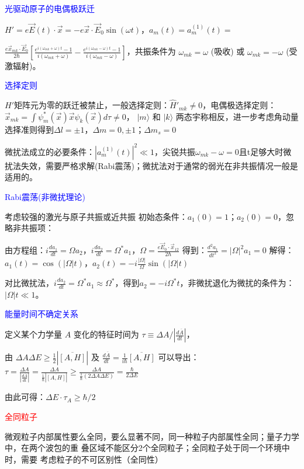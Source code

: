 \documentclass[a4paper,8pt]{extarticle} %
\newcommand{\bluetext}[1]{\textcolor{blue}{#1}}
\newcommand{\redtext}[1]{\textcolor{red}{#1}}
\begin{document}
\begin{multicols}{3}
\bluetext{光驱动原子的电偶极跃迁}

$H' = e\vec{E}(t)\cdot\vec{x} = -e\vec{x}\cdot\vec{E}_0\sin(\omega t)$，$a_m(t) = a_m^{(1)}(t) =$ 

$ \frac{e\vec{x}_{mk}\cdot\vec{E}_0}{2\hbar}\left[\frac{e^{i(\omega_{mk}+\omega)t}-1}{i(\omega_{mk}+\omega)} - \frac{e^{i(\omega_{mk}-\omega)t}-1}{i(\omega_{mk}-\omega)}\right]$，共振条件为 $\omega_{mk} = \omega$ (吸收) 或 $\omega_{mk} = -\omega$ (受激辐射)。

\bluetext{选择定则}

$H'$矩阵元为零的跃迁被禁止，一般选择定则：$\hat{H}'_{mk}\neq 0$，电偶极选择定则：$\vec{x}_{mk}=\int{\psi_m^*(\vec{x})\vec{x}\psi_k(\vec{x}) d\tau} \neq 0$，
$|m\rangle$ 和 $|k\rangle$ 两态宇称相反，进一步考虑角动量选择准则得到$\Delta l = \pm1$，$\Delta m = 0, \pm1$；$\Delta m_s = 0$

微扰法成立的必要条件：$|a_m^{(1)}(t)|^2\ll 1$，尖锐共振$\omega_{mk}-\omega=0$且t足够大时微扰法失效，需要严格求解(Rabi震荡)；微扰法对于通常的弱光在非共振情况一般是适用的。

\bluetext{Rabi震荡(非微扰理论)}

考虑较强的激光与原子共振或近共振
初始态条件：$a_1(0) = 1$；$a_2(0) = 0$，忽略非共振项：

由方程组：$i\frac{da_1}{dt} = \Omega a_2$，$i\frac{da_2}{dt} = \Omega^* a_1$，$\Omega = \frac{e\vec{E}_0\cdot\vec{x}_{12}}{2\hbar}$ 得到：$\frac{d^2a_1}{dt^2} = |\Omega|^2 a_1 = 0$ 解得：$a_1(t) = \cos(|\Omega|t)$，$a_2(t) = -i\frac{|\Omega|}{\Omega}\sin(|\Omega|t)$

对比微扰法，$i\frac{da_2}{dt} = \Omega^* a_1 \approx \Omega^* $，得到$a_2 = -i\Omega^* t$，非微扰退化为微扰的条件为：$|\Omega|t \ll 1$。

\bluetext{能量时间不确定关系}

定义某个力学量 $A$ 变化的特征时间为 $\tau \equiv \Delta A/|\frac{d\overline{A}}{dt}|$，

由 $\Delta A\Delta E \geq \frac{1}{2}|\overline{[A,H]}|$ 及 $\frac{d\overline{A}}{dt}=\frac{1}{i\hbar}\overline{[A,H]}$ 可以导出：
$\tau = \frac{\Delta A}{|\frac{d\overline{A}}{dt}|} = \frac{\Delta A}{\frac{1}{\hbar}|\overline{[A,H]}|} \geq \frac{\Delta A}{\frac{1}{\hbar}(2\Delta A\Delta E)} = \frac{\hbar}{2\Delta E}$

由此可得：$\Delta E \cdot \tau_A \geq \hbar/2$

\redtext{全同粒子}

微观粒子内部属性要么全同，要么显著不同，同一种粒子内部属性全同；量子力学中，在两个波包的重
叠区域不能区分2个全同粒子；全同粒子处于同一个环境中时，需要
考虑粒子的不可区别性（全同性）


\end{multicols}
\end{document}
